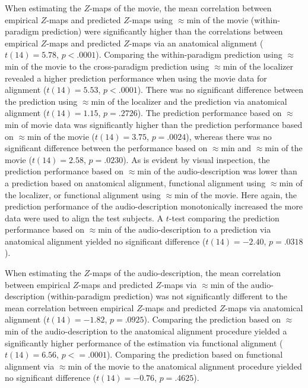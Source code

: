 %
When estimating the $Z$-maps of the movie, the mean correlation between
empirical $Z$-maps and predicted $Z$-maps using $\approx$\unit[15]{min} of the
movie (within-paradigm prediction) were significantly higher than the
correlations between empirical $Z$-maps and predicted $Z$-maps via an anatomical
alignment ($t(14)= 5.78$, $p<.0001$).
%
Comparing the within-paradigm prediction using $\approx$\unit[15]{min} of the
movie to the cross-paradigm prediction using $\approx$\unit[15]{min} of the
localizer revealed a higher prediction performance when using the movie data for
alignment ($t(14)=5.53$, $p<.0001$).
%
There was no significant difference between the prediction using
$\approx$\unit[15]{min} of the localizer and the prediction via anatomical
alignment ($t(14)=1.15$, $p=.2726$).
%
The prediction performance based on $\approx$\unit[30]{min} of movie data was
significantly higher than the prediction performance based on
$\approx$\unit[15]{min} of the movie ($t(14)= 3.75$, $p=.0024$), whereas there
was no significant difference between the performance based on
$\approx$\unit[45]{min} and $\approx$\unit[30]{min} of the movie ($t(14)=2.58$,
$p=.0230$).
%
As is evident by visual inspection, the prediction performance based on
$\approx$\unit[15]{min} of the audio-description was lower than a prediction
based on anatomical alignment, functional alignment using
$\approx$\unit[15]{min} of the localizer, or functional alignment using
$\approx$\unit[15]{min} of the movie.
%
Here again, the prediction performance of the audio-description monotonically
increased the more data were used to align the test subjects.
%
A $t$-test comparing the prediction performance based on
$\approx$\unit[120]{min} of the audio-description to a prediction via anatomical
alignment yielded no significant difference ($t(14)=-2.40$, $p=.0318$).

%
When estimating the $Z$-maps of the audio-description, the mean correlation
between empirical $Z$-maps and predicted $Z$-maps via $\approx$\unit[15]{min} of
the audio-description (within-paradigm prediction) was not significantly
different to the mean correlation between empirical $Z$-maps and predicted
$Z$-maps via anatomical alignment ($t(14)=-1.82$, $p=.0925$).
%
Comparing the prediction based on $\approx$\unit[120]{min} of the
audio-description to the anatomical alignment procedure yielded a significantly
higher performance of the estimation via functional alignment ($t(14)=6.56$,
$p<=.0001$).
%
Comparing the prediction based on functional alignment via
$\approx$\unit[120]{min} of the movie to the anatomical alignment procedure
yielded no significant difference ($t(14)=-0.76$, $p=.4625$).



